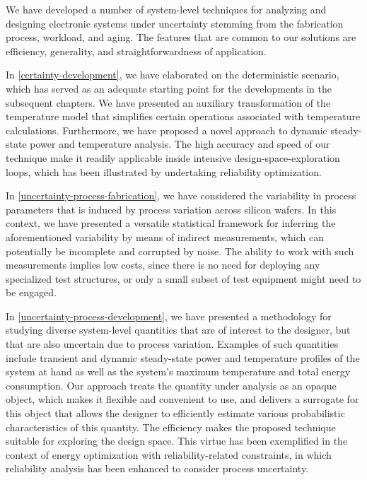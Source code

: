 We have developed a number of system-level techniques for analyzing and
designing electronic systems under uncertainty stemming from the fabrication
process, workload, and aging. The features that are common to our solutions are
efficiency, generality, and straightforwardness of application.

In \cref{certainty-development}, we have elaborated on the deterministic
scenario, which has served as an adequate starting point for the developments in
the subsequent chapters. We have presented an auxiliary transformation of the
temperature model that simplifies certain operations associated with temperature
calculations. Furthermore, we have proposed a novel approach to dynamic
steady-state power and temperature analysis. The high accuracy and speed of our
technique make it readily applicable inside intensive design-space-exploration
loops, which has been illustrated by undertaking reliability optimization.

In \cref{uncertainty-process-fabrication}, we have considered the variability in
process parameters that is induced by process variation across silicon wafers.
In this context, we have presented a versatile statistical framework for
inferring the aforementioned variability by means of indirect measurements,
which can potentially be incomplete and corrupted by noise. The ability to work
with such measurements implies low costs, since there is no need for deploying
any specialized test structures, or only a small subset of test equipment might
need to be engaged.

In \cref{uncertainty-process-development}, we have presented a methodology for
studying diverse system-level quantities that are of interest to the designer,
but that are also uncertain due to process variation. Examples of such
quantities include transient and dynamic steady-state power and temperature
profiles of the system at hand as well as the system's maximum temperature and
total energy consumption. Our approach treats the quantity under analysis as an
opaque object, which makes it flexible and convenient to use, and delivers a
surrogate for this object that allows the designer to efficiently estimate
various probabilistic characteristics of this quantity. The efficiency makes the
proposed technique suitable for exploring the design space. This virtue has been
exemplified in the context of energy optimization with reliability-related
constraints, in which reliability analysis has been enhanced to consider process
uncertainty.

